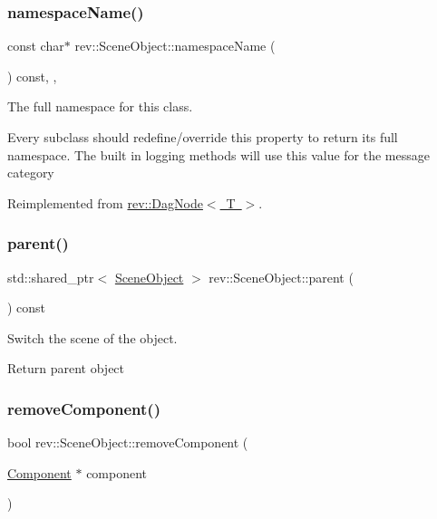 \subsubsection{\texorpdfstring{namespaceName()}{namespaceName()}}
{\footnotesize\ttfamily const char$\ast$ rev\+::\+Scene\+Object\+::namespace\+Name (\begin{DoxyParamCaption}{ }\end{DoxyParamCaption}) const\hspace{0.3cm}{\ttfamily [inline]}, {\ttfamily [override]}, {\ttfamily [virtual]}}



The full namespace for this class. 

Every subclass should redefine/override this property to return its full namespace. The built in logging methods will use this value for the message category 

Reimplemented from \mbox{\hyperlink{classrev_1_1_dag_node_a65d5289cdff9f83fde666474c33f4a5b}{rev\+::\+Dag\+Node$<$ T $>$}}.

\mbox{\label{classrev_1_1_scene_object_a51980b8993675edf967883dd6988dce8}} 
\subsubsection{\texorpdfstring{parent()}{parent()}}
{\footnotesize\ttfamily std\+::shared\+\_\+ptr$<$ \mbox{\hyperlink{classrev_1_1_scene_object}{Scene\+Object}} $>$ rev\+::\+Scene\+Object\+::parent (\begin{DoxyParamCaption}{ }\end{DoxyParamCaption}) const}



Switch the scene of the object. 

Return parent object \mbox{\label{classrev_1_1_scene_object_abb059633877c5d136545d7a34aa3cbdb}} 
\subsubsection{\texorpdfstring{removeComponent()}{removeComponent()}}
{\footnotesize\ttfamily bool rev\+::\+Scene\+Object\+::remove\+Component (\begin{DoxyParamCaption}\item[{\mbox{\hyperlink{classrev_1_1_component}{Component}} $\ast$}]{component }\end{DoxyParamCaption})}



